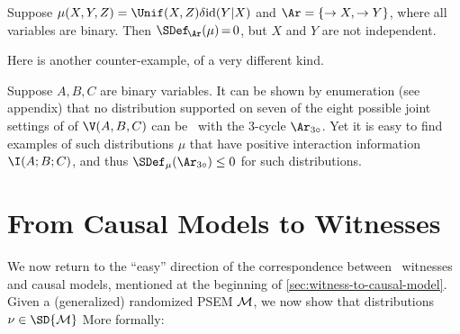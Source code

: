 \begin{subappendices}
\begin{example}
    Suppose $\mu(X,Y,Z) = \Unif(X,Z) \delta \mathrm{id} (Y|X)$ and $\Ar = \{\to X, \to Y\}$,
    where all variables are binary.
    Then $\SDef_{\!\Ar}(\mu) \,{=}\, 0$, but $X$ and $Y$ are not independent.
    \qedhere
\end{example}
Here is another counter-example, of a very different kind.
\begin{example}
    Suppose  $A, B, C$ are binary variables.
    It can be shown by enumeration (see appendix) that
    no distribution supported on seven of the eight
    possible joint settings of of $\V(A,B,C)$ can be
    \scible\ with the 3-cycle $\Ar_{3\circ}$. Yet it is easy
    to find examples of such distributions $\mu$ that have positive
    interaction information $\I(A;B;C)$,
    and thus $\SDef_{\mu}(\Ar_{3\circ}) \le 0$ for such distributions.
\end{example}

\section{From Causal Models to Witnesses}
    \label{appendix:sem2witness}
    
We now return to the ``easy'' direction of the correspondence between \scibility\ witnesses and causal models, mentioned at the beginning of \cref{sec:witness-to-causal-model}.
Given a (generalized) randomized PSEM $\cal M$, we now show that distributions $\nu \in \SD{\cal M}$ 
%
More formally:


\end{subappendices}
